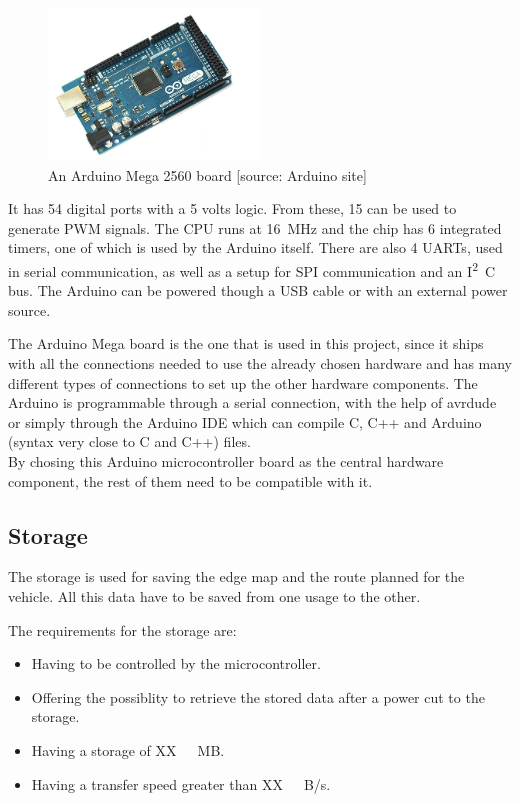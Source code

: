 \begin{figure}[H]
	\centering
	\includegraphics[width=0.5\textwidth]{figures/ArduinoMega.png}
		\caption{An Arduino Mega 2560 board [source: Arduino site]} 
	\label{ArduinoMega}
\end{figure}
%
It has \si{54} digital ports with a 5 volts logic. From these, \si{15} can be used to generate PWM signals. The CPU runs at \si{16 MHz} and the chip has \si{6} integrated timers, one of which is used by the Arduino itself. There are also 4 UARTs, used in serial communication, as well as a setup for SPI communication and an \si{I^2C} bus. The Arduino can be powered though a USB cable or with an external power source.

The Arduino Mega board is the one that is used in this project, since it ships with all the connections needed to use the already chosen hardware and has many different types of connections to set up the other hardware components. The Arduino is programmable through a serial connection, with the help of avrdude\cite{Avrdude} or simply through the Arduino IDE\cite{ArduinoIDE} which can compile C, C++ and Arduino (syntax very close to C and C++) files.\\
%
By chosing this Arduino microcontroller board as the central hardware component, the rest of them need to be compatible with it.


\subsection{Storage}
The storage is used for saving the edge map and the route planned for the vehicle. All this data have to be saved from one usage to the other.

The requirements for the storage are:
\begin{itemize}
\item Having to be controlled by the microcontroller.
\item Offering the possiblity to retrieve the stored data after a power cut to the storage.
\item Having a storage of \si{XX\ MB}. 
\item Having a transfer speed greater than \si{XX\ B/s}. 
\end{itemize}

